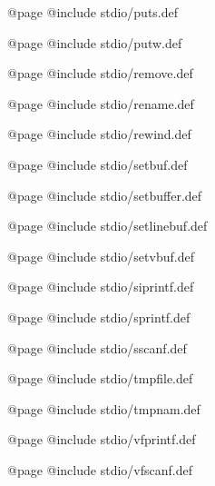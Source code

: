 @page
@include stdio/puts.def

@page 
@include stdio/putw.def 

@page
@include stdio/remove.def

@page
@include stdio/rename.def

@page
@include stdio/rewind.def

@page
@include stdio/setbuf.def

@page
@include stdio/setbuffer.def

@page
@include stdio/setlinebuf.def

@page
@include stdio/setvbuf.def

@page 
@include stdio/siprintf.def 

@page 
@include stdio/sprintf.def 

@page
@include stdio/sscanf.def 

@page
@include stdio/tmpfile.def

@page
@include stdio/tmpnam.def

@page 
@include stdio/vfprintf.def 

@page
@include stdio/vfscanf.def
